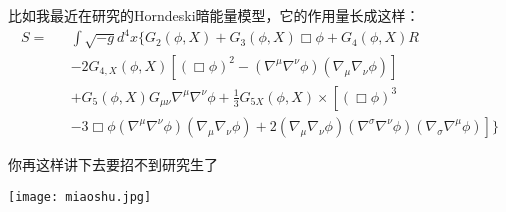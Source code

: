 \documentclass[CJK]{beamer}
\begin{document}
\begin{frame}

\bch
比如我最近在研究的Horndeski暗能量模型，它的作用量长成这样：
{\scriptsize
  \begin{eqnarray}
    S = && \int \sqrt{-g}d^4x \Big\{ G_2(\phi, X) + G_3(\phi, X)\Box\phi + G_4(\phi,X)R \nonumber \\
    && - 2G_{4,X}(\phi, X)\left[(\Box\phi)^2 - (\nabla^\mu\nabla^\nu\phi) (\nabla_\mu\nabla_\nu\phi)\right] \nonumber \\
    && + G_5(\phi, X)G_{\mu\nu}\nabla^\mu\nabla^\nu\phi +\frac{1}{3}G_{5X}(\phi, X)\times\left[(\Box\phi)^3 \right.\nonumber \\
    && \left.- 3 \Box\phi(\nabla^\mu\nabla^\nu\phi) (\nabla_\mu\nabla_\nu\phi) + 2(\nabla_\mu\nabla_\nu\phi)(\nabla^\sigma\nabla^\nu\phi) (\nabla_\sigma\nabla^\mu\phi)\right]\Big\}\nonumber
  \end{eqnarray}
}
\ech
\end{frame}

\begin{frame}
\bch
\skipline
\begin{minipage}{0.4\textwidth}

你再这样讲下去要招不到研究生了
\vskip 2in
\ 
\end{minipage}
\texttt{[image: miaoshu.jpg]}
\ech
\end{frame}


\begin{frame}
\bch
{}
\ech
\end{frame}
\end{document}
